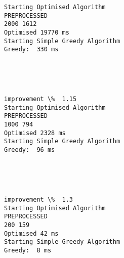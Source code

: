 \documentclass[11pt]{article}
\begin{document}
    \begin{Verbatim}[commandchars=\\\{\}]
Starting Optimised Algorithm
PREPROCESSED
2000 1612
Optimised 19770 ms
Starting Simple Greedy Algorithm
Greedy:  330 ms

    \end{Verbatim}

    \begin{center}
    \end{center}
    { \hspace*{\fill} \\}
    
    \begin{center}
    \end{center}
    { \hspace*{\fill} \\}
    
    \begin{Verbatim}[commandchars=\\\{\}]
improvement \%  1.15
Starting Optimised Algorithm
PREPROCESSED
1000 794
Optimised 2328 ms
Starting Simple Greedy Algorithm
Greedy:  96 ms

    \end{Verbatim}

    \begin{center}
    \end{center}
    { \hspace*{\fill} \\}
    
    \begin{center}
    \end{center}
    { \hspace*{\fill} \\}
    
    \begin{Verbatim}[commandchars=\\\{\}]
improvement \%  1.3
Starting Optimised Algorithm
PREPROCESSED
200 159
Optimised 42 ms
Starting Simple Greedy Algorithm
Greedy:  8 ms

    \end{Verbatim}

    \begin{center}
    \end{center}
    { \hspace*{\fill} \\}
    
\end{document}
